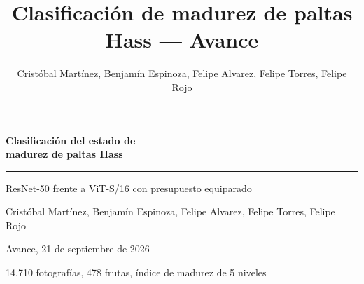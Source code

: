 \documentclass[aspectratio=169,11pt,table]{beamer}
\title{Clasificación de madurez de paltas Hass --- Avance}
\author{Cristóbal Martínez, Benjamín Espinoza, Felipe Alvarez, Felipe Torres, Felipe Rojo}
\begin{document}
{
\begin{frame}[plain]
  \vspace{1.4cm}
  {\color{white}\Huge\bfseries\linespread{1.15}\selectfont Clasificación del estado de\\madurez de paltas Hass}

  \vspace{0.55cm}
  {\color{verdecla}\rule{\textwidth}{1.6pt}}

  \vspace{0.55cm}
  {\color{white!85!verdecla}\large ResNet-50 frente a ViT-S/16 con presupuesto equiparado}

  \vfill
  {\color{white!70!verdecla}\small Cristóbal Martínez, Benjamín Espinoza, Felipe Alvarez, Felipe Torres, Felipe Rojo}

  \vspace{0.15em}
  {\color{white!70!verdecla}\small Avance, 21 de septiembre de 2026}

  \vspace{0.2em}
  {\color{white!60!verdecla}\footnotesize 14.710 fotografías, 478 frutas, índice de madurez de 5 niveles}
  \vspace{0.6cm}
\end{frame}
}
\end{document}
